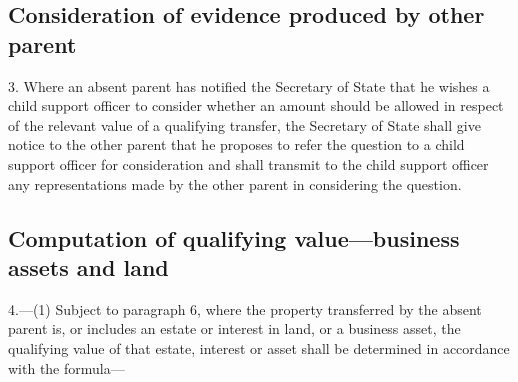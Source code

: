 \documentclass[12pt,a4paper]{article}
\begin{document}
\subsection*{Consideration of evidence produced by other parent}

3.  Where an absent parent has notified the Secretary of State that he wishes a child support officer to consider whether an amount should be allowed in respect of the relevant value of a qualifying transfer, the Secretary of State shall give notice to the other parent that he proposes to refer the question to a child support officer for consideration and shall transmit to the child support officer any representations made by the other parent in considering the question.

\subsection*{{Computation of qualifying value—business assets} and land}

4.—(1) Subject to paragraph 6, where the property 
transferred  %
by the absent parent is, or includes an estate or interest in land, or a business asset, the qualifying value of that estate, interest or asset shall be determined in accordance with the formula—
%
%
\end{document}
